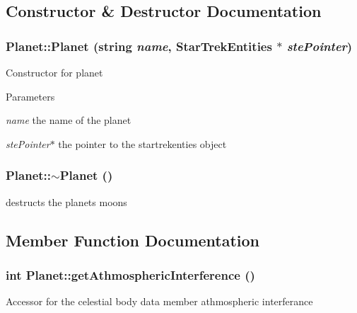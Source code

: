\subsection{Constructor \& Destructor Documentation}
\hypertarget{classPlanet_ac5a904c9d24bd4244ad72bb7ae3689f8}{
\subsubsection[{Planet}]{\setlength{\rightskip}{0pt plus 5cm}Planet::Planet (string {\em name}, \/  {\bf StarTrekEntities} $\ast$ {\em stePointer})}}
\label{d5/dec/classPlanet_ac5a904c9d24bd4244ad72bb7ae3689f8}
Constructor for planet


\begin{DoxyParams}{Parameters}
\item[{\em name}]the name of the planet \item[{\em stePointer$\ast$}]the pointer to the startrekenties object \end{DoxyParams}
\hypertarget{classPlanet_aaa1aaed9d4ef90b4836531edb7b18e0a}{
\subsubsection[{$\sim$Planet}]{\setlength{\rightskip}{0pt plus 5cm}Planet::$\sim$Planet ()}}
\label{d5/dec/classPlanet_aaa1aaed9d4ef90b4836531edb7b18e0a}
destructs the planets moons 

\subsection{Member Function Documentation}
\hypertarget{classPlanet_a802c105bafd608a0ac57e8f03d2d2465}{
\subsubsection[{getAthmosphericInterference}]{\setlength{\rightskip}{0pt plus 5cm}int Planet::getAthmosphericInterference ()}}
\label{d5/dec/classPlanet_a802c105bafd608a0ac57e8f03d2d2465}
Accessor for the celestial body data member athmospheric interferance

